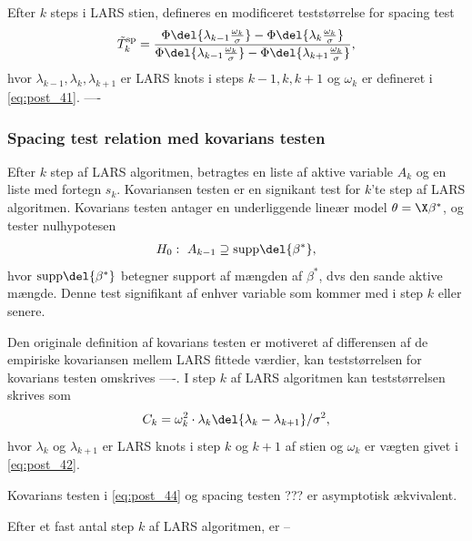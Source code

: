 \begin{thm}
Efter \(k\) steps i LARS stien, defineres en modificeret teststørrelse for spacing test
\begin{align}
\tilde{T}_k^\text{sp}= \frac{\Phi \del{\lambda_{k-1} \frac{\omega_k}{\sigma}} - \Phi \del{\lambda_{k} \frac{\omega_k}{\sigma}}}{\Phi \del{\lambda_{k-1} \frac{\omega_k}{\sigma}} - \Phi \del{\lambda_{k+1} \frac{\omega_k}{\sigma}}}, \label{eq:post_43}
\end{align}
hvor \(\lambda_{k-1}, \lambda_k, \lambda_{k+1}\) er LARS knots i steps \(k-1, k, k+1\) og \(\omega_k\) er defineret i \eqref{eq:post_41}.
----
\end{thm}

\subsubsection{Spacing test relation med kovarians testen}
Efter \(k\) step af LARS algoritmen, betragtes en liste af aktive variable \(A_k\) og en liste med fortegn \(s_k\).
Kovariansen testen er en signikant test for \(k\)'te step af LARS algoritmen.
Kovarians testen antager en underliggende lineær model \(\theta=\X \beta^*\), og tester nulhypotesen
\begin{align*}
H_0: \ A_{k-1} \supseteq \text{supp} \del{\beta^*},
\end{align*}
hvor \(\text{supp} \del{\beta^*}\) betegner support af mængden af \(\beta^*\), dvs den sande aktive mængde.
Denne test signifikant af enhver variable som kommer med i step \(k\) eller senere.

Den originale definition af kovarians testen er motiveret af differensen af de empiriske kovariansen mellem LARS fittede værdier, kan teststørrelsen for kovarians testen omskrives ----.
I step \(k\) af LARS algoritmen kan teststørrelsen skrives som
\begin{align}
C_k = \omega_k^2 \cdot \lambda_k \del{\lambda_k - \lambda_{k+1}} / \sigma^2, \label{eq:post_44}
\end{align}
hvor \(\lambda_k\) og \(\lambda_{k+1}\) er LARS knots i step \(k\) og \(k+1\) af stien og \(\omega_k\) er vægten givet i \eqref{eq:post_42}.


Kovarians testen i \eqref{eq:post_44} og spacing testen ??? er asymptotisk ækvivalent.

\begin{thm}
Efter et fast antal step \(k\) af LARS algoritmen, er --
\end{thm}